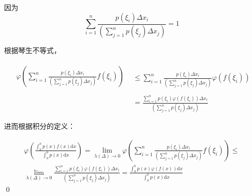 因为 
\begin{equation*}
	\sum _{i=1}^{n}\frac{p( \xi _{i}) \Delta x_{i}}{\left(\sum _{j=1}^{n} p( \xi _{j}) \Delta x_{j}\right)} =1
\end{equation*}


根据琴生不等式，


\begin{equation*}
	\begin{aligned}
		\begin{array}{l}
			\varphi \left(\sum _{i=1}^{n}\frac{p( \xi _{i}) \Delta x_{i}}{\left(\sum _{j=1}^{n} p( \xi _{j}) \Delta x_{j}\right)} f( \xi _{i})\right)\\
		\end{array} & \leqslant \sum _{i=1}^{n}\frac{p( \xi _{i}) \Delta x_{i}}{\left(\sum _{j=1}^{n} p( \xi _{j}) \Delta x_{j}\right)} \varphi ( f( \xi _{i}))\\
		& =\frac{\sum _{i=1}^{n} p( \xi _{i}) \varphi ( f( \xi _{i})) \Delta x_{i}}{\left(\sum _{j=1}^{n} p( \xi _{j}) \Delta x_{j}\right)}
	\end{aligned}
\end{equation*}


进而根据积分的定义：

\begin{gather*}
	\varphi \left(\frac{\int _{a}^{b} p( x) f( x)\mathrm{d} x}{\int _{a}^{b} p( x)\mathrm{d} x}\right) =\lim _{\lambda ( \Delta )\rightarrow 0} \varphi \left(\sum _{i=1}^{n}\frac{p( \xi _{i}) \Delta x_{i}}{\left(\sum _{j=1}^{n} p( \xi _{j}) \Delta x_{j}\right)} f( \xi _{i})\right) \leqslant \\
	\lim _{\lambda ( \Delta )\rightarrow 0}\frac{\sum _{i=1}^{n} p( \xi _{i}) \varphi ( f( \xi _{i})) \Delta x_{i}}{\left(\sum _{j=1}^{n} p( \xi _{j}) \Delta x_{j}\right)} =\frac{\int _{a}^{b} p( x) \varphi ( f( x))\mathrm{d} x}{\int _{a}^{b} p( x)\mathrm{d} x}
\end{gather*}
\qed 



\ifx\allfiles\undefined

\fi